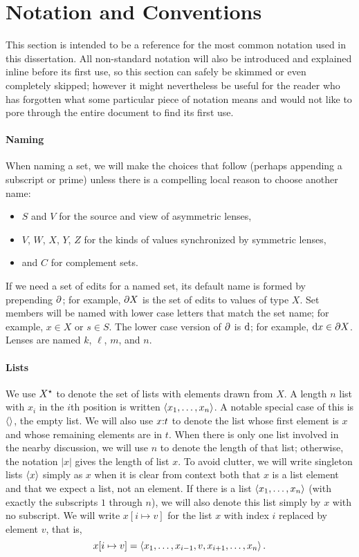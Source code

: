 \section{Notation and Conventions}
\label{sec:notation}
This section is intended to be a reference for the most common notation used
in this dissertation. All non-standard notation will also be introduced and
explained inline before its first use, so this section can safely be skimmed
or even completely skipped; however it might nevertheless be useful for the
reader who has forgotten what some particular piece of notation means and
would not like to pore through the entire document to find its first use.

\paragraph*{Naming}
When naming a set, we will make the choices that follow (perhaps appending a
subscript or prime) unless there is a compelling local reason to choose
another name:
\begin{itemize}
    \item $S$ and $V$ for the source and view of asymmetric lenses,
    \item $V$, $W$, $X$, $Y$, $Z$ for the kinds of values synchronized by
        symmetric lenses,
    \item and $C$ for complement sets.
\end{itemize}
If we need a set of edits for a named set, its default name is formed by
prepending $\partial$; for example, $\partial X$ is the set of edits to values of type
$X$. Set members will be named with lower case letters that match the set
name; for example, $x \in X$ or $s \in S$. The lower case version of $\partial$ is
$\textrm{d}$; for example, $\textrm{d} x \in \partial X$. Lenses are named $k$, $\ell$, $m$, and
$n$.

\paragraph*{Lists}
We use $X^\star$ to denote the set of lists with elements drawn from $X$. A
length $n$ list with $x_i$ in the $i$th position is written $\left< x_1
,\ldots, x_n \right>$. A notable special case of this is $\left<\right>$, the empty
list. We will also use $x \mathord{:} t$ to denote the list whose first element
is $x$ and whose remaining elements are in $t$. When there is only one list
involved in the nearby discussion, we will use $n$ to denote the length of
that list; otherwise, the notation $|x|$ gives the length of list $x$. To
avoid clutter, we will write singleton lists $\left< x \right>$ simply as $x$
when it is clear from context both that $x$ is a list element and that we
expect a list, not an element. If there is a list $\left< x_1 ,\ldots, x_n
\right>$ (with exactly the subscripts $1$ through $n$), we will also denote
this list simply by $x$ with no subscript. We will write $x[i \mapsto v]$
for the list $x$ with index $i$ replaced by element $v$, that is,
\[x[i \mapsto v] = \left< x_1 ,\ldots, x_{i-1} , v , x_{i+1} ,\ldots,
x_n \right>.\]

